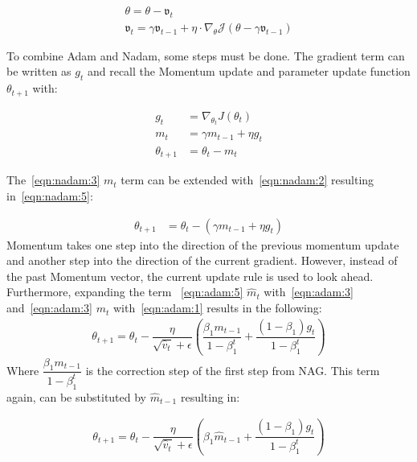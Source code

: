 \begin{align}
    \theta = \theta - \mathfrak{v}_t \label{eqn:nag:1}\\
    \mathfrak{v}_t = \gamma\mathfrak{v}_{t-1} + \eta\cdot\nabla_\theta\mathcal{J}(\theta-\gamma\mathfrak{v}_{t-1}) \label{eqn:nag:2}
\end{align}

To combine \gls{Adam} and \gls{Nadam}, some steps must be done.
The gradient term can be written as $g_t$ and recall the Momentum update and parameter update function $\theta_{t+1}$ with:

\begin{align}
g_t &= \nabla_{\theta_t}J(\theta_t) \label{eqn:nadam:1} \\
m_t &= \gamma m_{t-1} + \eta g_t \label{eqn:nadam:2}\\
\theta_{t+1} &= \theta_t - m_t \label{eqn:nadam:3}
\end{align}

The~\ref{eqn:nadam:3} $m_t$ term can be extended with~\ref{eqn:nadam:2} resulting in~\ref{eqn:nadam:5}:

\begin{align}
\theta_{t+1} &= \theta_t - (\gamma m_{t-1} + \eta g_t) \label{eqn:nadam:5}
\end{align}
Momentum takes one step into the direction of the previous momentum update and another step into the direction of the current
gradient.
However, instead of the past Momentum vector, the current update rule is used to look ahead.
Furthermore, expanding the term ~\ref{eqn:adam:5} $\hat{m}_t$ with~\ref{eqn:adam:3} and~\ref{eqn:adam:3} $m_t$ with~\ref{eqn:adam:1}
results in the following:
\begin{align}
 \theta_{t+1} = \theta_{t} - \dfrac{\eta}{\sqrt{\hat{v}_t} + \epsilon} (\dfrac{\beta_1 m_{t-1}}{1 - \beta^t_1} + \dfrac{(1 - \beta_1) g_t}{1 - \beta^t_1})
 \label{eqn:nadam:6}
\end{align}
Where $\dfrac{\beta_1 m_{t-1}}{1 - \beta^t_1}$ is the correction step of the first step from NAG.
This term again, can be substituted by $\hat{m}_{t-1}$ resulting in:

\begin{align}
    \theta_{t+1} = \theta_{t} - \dfrac{\eta}{\sqrt{\hat{v}_t} + \epsilon} (\beta_1 \hat{m}_{t-1} + \dfrac{(1 - \beta_1) g_t}{1 - \beta^t_1})
    \label{eqn:nadam:7}
\end{align}

